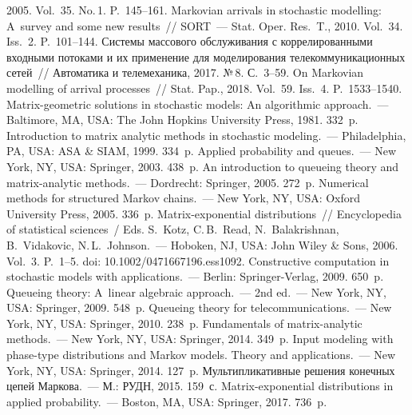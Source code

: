 \begin{multicols}{2}
{{\begin{thebibliography}{99}
2005. Vol.~35. No.\,1. P.~145--161.
 Markovian arrivals in stochastic 
modelling: A~survey and some new results~// SORT~--- Stat. Oper. Res.~T., 2010. 
Vol.~34. Iss.~2. P.~101--144.
 Системы массового обслуживания с 
коррелированными входными потоками и их применение для моделирования 
телекоммуникационных сетей~// Автоматика и телемеханика, 2017. №\,8. С.~3--59.
 On Markovian modelling of arrival processes~// 
Stat. Pap., 2018. Vol.~59. Iss.~4. P.~1533--1540. 
 Matrix-geometric solutions in stochastic models: An algorithmic approach.~--- 
Baltimore, MA, USA: The John Hopkins University Press, 1981. 332~p.
 Introduction to matrix analytic methods in stochastic modeling.~--- 
Philadelphia, PA, USA: ASA \& SIAM, 1999. 334~p.
 Applied probability and queues.~--- New York, NY, USA: Springer, 2003. 
438~p.
 An introduction to queueing theory and matrix-analytic methods.~--- 
Dordrecht: Springer, 2005. 272~p.
 Numerical methods for structured Markov chains.~--- 
New York, NY, USA: Oxford University Press, 2005. 336~p.
 Matrix-exponential distributions~// Encyclopedia of statistical 
sciences~/ Eds. S.~Kotz, C.\,B.~Read, N.~Balakrishnan, 
B.~Vidakovic, N.\,L.~Johnson.~--- Hoboken, NJ, USA: John Wiley \& Sons, 2006. Vol.~3. P.~1--5.
doi: 10.1002/0471667196.ess1092.
 Constructive computation in stochastic models with applications.~--- Berlin: Springer-Verlag, 2009. 650~p.
 Queueing theory: A~linear algebraic approach.~--- 2nd ed.~--- New York, NY, 
USA: Springer, 2009. 548~p.
 Queueing theory for telecommunications.~--- New York, NY, USA: Springer, 2010. 
238~p.
 Fundamentals of matrix-analytic methods.~--- New York, NY, USA: Springer, 2014. 
349~p.
 Input modeling with phase-type distributions and Markov 
models. Theory and applications.~--- New York, NY, USA: Springer, 2014. 127~p.
 Мультипликативные решения 
конечных цепей Маркова.~--- М.: РУДН, 2015. 159~с.
 Matrix-exponential distributions in applied probability.~--- Boston, MA, USA: 
Springer, 2017. 736~p.
\end{thebibliography}

 }
 }

\end{multicols}

